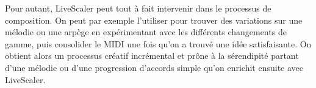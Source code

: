 Pour autant, LiveScaler peut tout à fait intervenir dans le processus de composition. On peut par exemple l'utiliser pour trouver des variations sur une mélodie ou une arpège en expérimentant avec les différents changements de gamme, puis consolider le MIDI une fois qu'on a trouvé une idée satisfaisante. On obtient alors un processus créatif incrémental et prône à la sérendipité partant d'une mélodie ou d'une progression d'accords simple qu'on enrichit ensuite avec LiveScaler.
